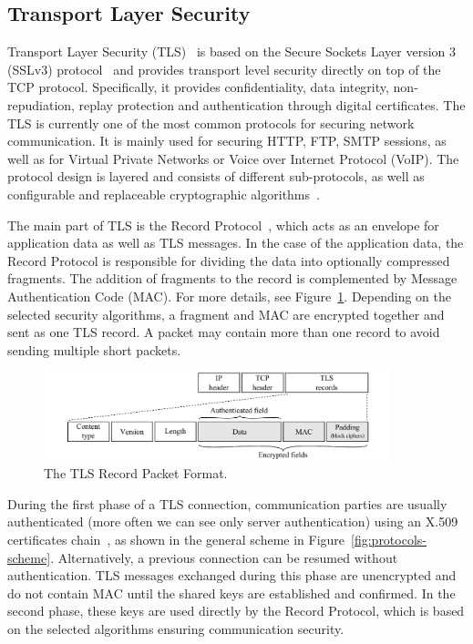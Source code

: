 
\subsection{Transport Layer Security}
Transport Layer Security (TLS)~\cite{rfc5246} is based on the Secure Sockets Layer version 3 (SSLv3) protocol~\cite{rfc6101} and provides transport level security directly on top of the TCP protocol. Specifically, it provides confidentiality, data integrity, non-repudiation, replay protection and authentication through digital certificates. The TLS is currently one of the most common protocols for securing network communication. It is mainly used for securing HTTP, FTP, SMTP sessions, as well as for Virtual Private Networks or Voice over Internet Protocol (VoIP). The protocol design is layered and consists of different sub-protocols, as well as configurable and replaceable cryptographic algorithms~\cite{tls-thesis}.

The main part of TLS is the Record Protocol~\cite{rfc5246}, which acts as an envelope for application data as well as TLS messages. In the case of the application data, the Record Protocol is responsible for dividing the data into optionally compressed fragments. The addition of fragments to the record is complemented by Message Authentication Code (MAC). For more details, see Figure~\ref{fig:tls-record}. Depending on the selected security algorithms, a fragment and MAC are encrypted together and sent as one TLS record. A packet may contain more than one record to avoid sending multiple short packets.

\begin{figure}[!ht]
	\begin{center}
		\includegraphics[width=0.9\textwidth]{figures/paper-encrypted/tls_record}
		\caption{The TLS Record Packet Format.} 
		\label{fig:tls-record}
	\end{center}
\end{figure}

During the first phase of a TLS connection, communication parties are usually authenticated (more often we can see only server authentication) using an X.509 certificates chain~\cite{rfc5280}, as shown in the general scheme in Figure~\ref{fig:protocols-scheme}. Alternatively, a previous connection can be resumed without authentication. TLS messages exchanged during this phase are unencrypted and do not contain MAC until the shared keys are established and confirmed. In the second phase, these keys are used directly by the Record Protocol, which is based on the selected algorithms ensuring communication security.

